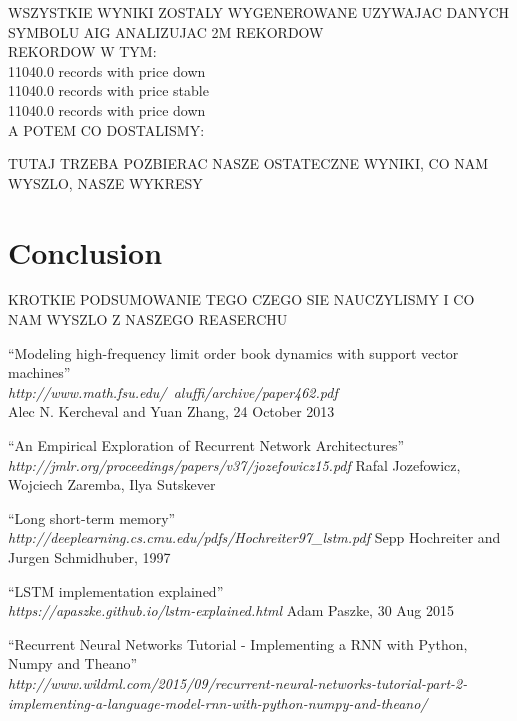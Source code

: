 \documentclass[twoside]{article}
\begin{document}
\begin{multicols}{2}
WSZYSTKIE WYNIKI ZOSTALY WYGENEROWANE UZYWAJAC DANYCH SYMBOLU AIG ANALIZUJAC 2M REKORDOW \\
 REKORDOW W TYM: \\
11040.0 records with price down \\
11040.0 records with price stable \\
11040.0 records with price down \\

A POTEM CO DOSTALISMY:

TUTAJ TRZEBA POZBIERAC NASZE OSTATECZNE WYNIKI, CO NAM WYSZLO, NASZE WYKRESY

\section{Conclusion}

KROTKIE PODSUMOWANIE TEGO CZEGO SIE NAUCZYLISMY I CO NAM WYSZLO Z NASZEGO REASERCHU


\begin{thebibliography}{99}

    ``Modeling high-frequency limit order book dynamics with support vector machines'' \\
\emph{http://www.math.fsu.edu/~aluffi/archive/paper462.pdf} \\
	Alec N. Kercheval and Yuan Zhang, 24 October 2013

	``An Empirical Exploration of Recurrent Network Architectures'' \\
\emph{http://jmlr.org/proceedings/papers/v37/jozefowicz15.pdf}
	Rafal Jozefowicz, Wojciech Zaremba, Ilya Sutskever
	
	``Long short-term memory'' \\
\emph{http://deeplearning.cs.cmu.edu/pdfs/Hochreiter97\_lstm.pdf}
	Sepp Hochreiter and Jurgen Schmidhuber, 1997

    ``LSTM implementation explained'' \\
\emph{https://apaszke.github.io/lstm-explained.html} 
	Adam Paszke, 30 Aug 2015

    ``Recurrent Neural Networks Tutorial - Implementing a RNN with Python, Numpy and Theano'' \\ \emph{http://www.wildml.com/2015/09/recurrent-neural-networks-tutorial-part-2-implementing-a-language-model-rnn-with-python-numpy-and-theano/}


\end{thebibliography}
\end{multicols}
\end{document}
